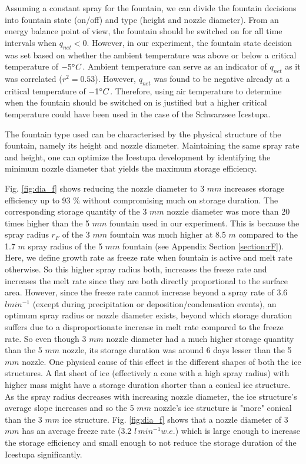 \documentclass[utf8]{frontiersSCNS} %
\begin{document}
Assuming a constant spray for the fountain, we can divide the fountain decisions into fountain state (on/off) and type
(height and nozzle diameter).  From an energy balance point of view, the fountain should be switched on for all time
intervals when $q_{net} < 0$. However, in our experiment, the fountain state decision was set based on whether the
ambient temperature was above or below a critical temperature of $-5 \degree C$. Ambient temperature can serve as an
indicator of $q_{net}$ as it was correlated ($r^2 = 0.53$).  However, $q_{net}$ was found to be negative already at a
critical temperature of $-1 \degree C$. Therefore, using air temperature to determine when the fountain should be
switched on is justified but a higher critical temperature could have been used in the case of the Schwarzsee Icestupa. 

The fountain type used can be characterised by the physical structure of the fountain, namely its height and nozzle
diameter. Maintaining the same spray rate and height, one can optimize the Icestupa development by identifying the
minimum nozzle diameter that yields the maximum storage efficiency. 

Fig. \ref{fig:dia_f} shows reducing the nozzle diameter to 3 $mm$ increases storage efficiency up to 93 \% without
compromising much on storage duration.  The corresponding storage quantity of the 3 $mm$ nozzle diameter was more than
20 times higher than the 5 $mm$ fountain used in our experiment. This is because the spray radius $r_F$ of the 3 $mm$
fountain was much higher at 8.5 $m$ compared to the 1.7 $m$ spray radius of the 5 $mm$ fountain (see Appendix Section
\ref{section:rF}). Here, we define growth rate as freeze rate when fountain is active and melt rate otherwise. So this
higher spray radius both, increases the freeze rate  and increases the melt rate since they are both directly
proportional to the surface area. However, since the freeze rate cannot increase beyond a spray rate of 3.6 $l min^{-1}$
(except during precipitation or deposition/condensation events), an optimum spray radius or nozzle diameter exists,
beyond which storage duration suffers due to a disproportionate increase in melt rate compared to the freeze rate. So
even though 3 $mm$ nozzle diameter had a much higher storage quantity than the 5 $mm$ nozzle, its storage duration was
around 6 days lesser than the 5 $mm$ nozzle. One physical cause of this effect is the different shapes of both the ice
structures. A flat sheet of ice (effectively a cone with a high spray radius) with higher mass might have a storage
duration shorter than a conical ice structure. As the spray radius decreases with increasing nozzle diameter, the ice
structure’s average slope increases and so the 5 $mm$ nozzle's ice structure is "more" conical than the 3 $mm$ ice
structure. Fig.  \ref{fig:dia_f} shows that a nozzle diameter of 3 $mm$ has an average freeze rate (3.2 $l \,min^{-1}
w.e.$) which is large enough to increase the storage efficiency and small enough to not reduce the storage duration of
the Icestupa significantly.
\end{document}

